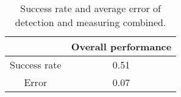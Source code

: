 \begin{table}%
\centering
\begin{tabular}{@{} *2c @{}}
\toprule
 & {Overall performance}\\ 
\midrule
Success rate	& 0.51 \\ 
Error 			& 0.07 \\
\bottomrule 
 \end{tabular}
 \caption[Overall success rate and average error of the system]{Success rate and average error of detection and measuring combined.}
\label{table:overall_overall}
\end{table}